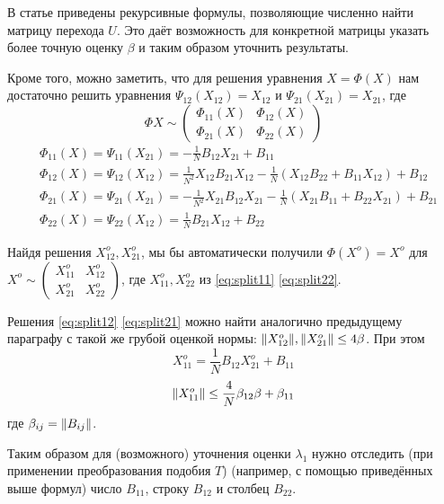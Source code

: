 В статье приведены рекурсивные формулы, позволяющие численно найти матрицу перехода \( U \).
Это даёт возможность для конкретной матрицы указать более точную оценку \( \beta \) и таким образом уточнить результаты.

Кроме того, можно заметить, что для решения уравнения \( X = \Phi(X) \)
нам достаточно решить уравнения \( \Psi_{12}(X_{12}) = X_{12} \) и \( \Psi_{21}(X_{21}) = X_{21} \),
где
\[
    \Phi X \sim
    \begin{pmatrix}
        \Phi_{11}(X) & \Phi_{12}(X) \\
        \Phi_{21}(X) & \Phi_{22}(X)
    \end{pmatrix}
\]
\begin{subequations}
    \begin{align}
        \label{eq:split11}
        & \Phi_{11}(X) = \Psi_{11}(X_{21}) = -\frac1N B_{12}X_{21} + B_{11} \\
        \label{eq:split12}
        & \Phi_{12}(X) = \Psi_{12}(X_{12}) = \frac{1}{N^2} X_{12}B_{21}X_{12} -
                                   \frac1N\left(X_{12}B_{22} +
                                   B_{11}X_{12}\right) + B_{12} \\
        \label{eq:split21}
        & \Phi_{21}(X) = \Psi_{21}(X_{21}) = -\frac{1}{N^2} X_{21}B_{12}X_{21} -
                                   \frac1N\left(X_{21}B_{11} +
                                   B_{22}X_{21}\right) +
                                   B_{21} \\
        \label{eq:split22}
        & \Phi_{22}(X) = \Psi_{22}(X_{12}) = \frac1N B_{21}X_{12} + B_{22}
    \end{align}
\end{subequations}

Найдя решения \( X_{12}^o, X_{21}^o \),
мы бы автоматически получили
\( \Phi(X^o) = X^o \) для
\( X^o \sim
\left(\begin{smallmatrix}
    X_{11}^o & X_{12}^o \\
    X_{21}^o & X_{22}^o
\end{smallmatrix}\right) \),
где \( X_{11}^o, X_{22}^o \) из \eqref{eq:split11} \eqref{eq:split22}.

Решения \eqref{eq:split12} \eqref{eq:split21} можно найти аналогично предыдущему параграфу
с такой же грубой оценкой нормы: \( {\left\|{X_{12}^o}\right\|}, {\left\|{X_{21}^o}\right\|} \leq 4\beta \).
При этом
\[ X_{11}^o = \frac1N B_{12} X_{21}^o + B_{11} \]
\[ {\left\|{X_{11}^o}\right\|} \leq \frac4N \beta_{12}\beta + \beta_{11} \]
где \( \beta_{ij} = {\left\|{B_{ij}}\right\|} \).

Таким образом для (возможного) уточнения оценки \( \lambda_1 \)
нужно отследить (при применении преобразования подобия \( T \)) (например, с помощью приведённых выше формул)
число \( B_{11} \), строку \( B_{12} \) и столбец \( B_{22} \).
